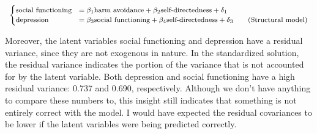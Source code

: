 \documentclass[11pt]{article}
\begin{document}
\begin{table}[h]
\vspace{0.2cm}
\begin{equation}
\footnotesize
  \begin{cases}
    \textrm{social functioning} & = \beta_1 \textrm{harm avoidance} + \beta_2 \textrm{self-directedness} + \delta_1 \\
    \textrm{depression} & = \beta_3 \textrm{social functioning} + \beta_4 \textrm{self-directedness} + \delta_3
    \tag{Structural model}
  \end{cases}
\end{equation}
\vspace{0.2cm}
\captionsetup{singlelinecheck=off}\caption{Structural model}
\label{tab:base_structural}
\end{table}

Moreover, the latent variables social functioning and depression have a residual
variance, since they are not exogenous in nature. In the standardized solution,
the residual variance indicates the portion of the variance that is not
accounted for by the latent variable. Both depression and social functioning
have a high residual variance: 0.737 and 0.690, respectively. Although we don't
have anything to compare these numbers to, this insight still indicates that
something is not entirely correct with the model. I would have expected the
residual covariances to be lower if the latent variables were being predicted
correctly.
\end{document}
